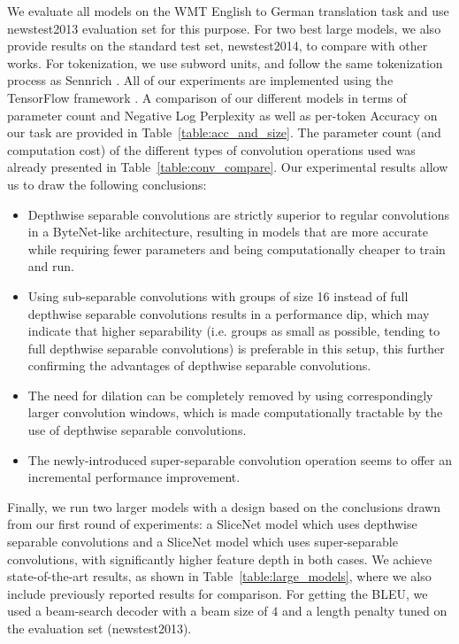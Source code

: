 \documentclass{article}
\begin{document}
We evaluate all models on the WMT English to German translation task and use newstest2013 evaluation set for this purpose.
For two best large models, we also provide results on the standard test set, newstest2014, to compare with other works.
For tokenization, we use subword units, and follow the same tokenization process as Sennrich \cite{SennrichHB15}.
All of our experiments are implemented using the TensorFlow framework \cite{tensorflow}.
A comparison of our different models in terms of parameter count and Negative Log Perplexity
as well as per-token Accuracy on our task are provided in Table~\ref{table:acc_and_size}.
The parameter count (and computation cost) of the different types of convolution operations used
was already presented in Table~\ref{table:conv_compare}.
Our experimental results allow us to draw the following conclusions:

\begin{itemize}
    \item Depthwise separable convolutions are strictly superior to regular convolutions in a ByteNet-like architecture, resulting in models that are more accurate while requiring fewer parameters and being computationally cheaper to train and run.
    \item Using sub-separable convolutions with groups of size 16 instead of full depthwise separable convolutions results in a performance dip, which may indicate that higher separability (i.e. groups as small as possible, tending to full depthwise separable convolutions) is preferable in this setup, this further confirming the advantages of depthwise separable convolutions.
    \item The need for dilation can be completely removed by using correspondingly larger convolution windows, which is made computationally tractable by the use of depthwise separable convolutions.
    \item The newly-introduced super-separable convolution operation seems to offer an incremental performance improvement.
\end{itemize}

Finally, we run two larger models with a design based on the conclusions drawn from our first round of experiments: a SliceNet model which uses depthwise separable convolutions and a SliceNet model which uses super-separable convolutions, with significantly higher feature depth in both cases. We achieve state-of-the-art results, as shown in Table~\ref{table:large_models}, where we also include
previously reported results for comparison. For getting the BLEU, we used a beam-search decoder with a beam size of $4$ and
a length penalty tuned on the evaluation set (newstest2013).
\end{document}
